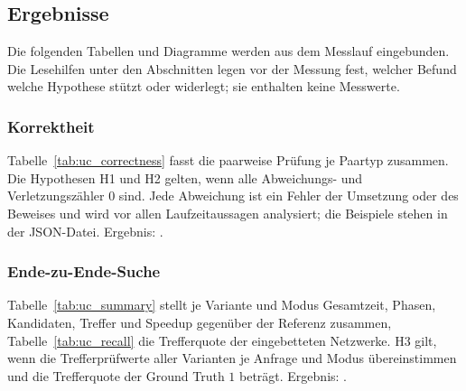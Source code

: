 \subsection{Ergebnisse}
\label{sec:ucx_ergebnisse}

Die folgenden Tabellen und Diagramme werden aus dem Messlauf eingebunden. Die Lesehilfen unter den Abschnitten legen vor der Messung fest, welcher Befund welche Hypothese stützt oder widerlegt; sie enthalten keine Messwerte.

\ucinputtables

\subsubsection{Korrektheit}

Tabelle~\ref{tab:uc_correctness} fasst die paarweise Prüfung je Paartyp zusammen. Die Hypothesen H1 und H2 gelten, wenn alle Abweichungs- und Verletzungszähler $0$ sind. Jede Abweichung ist ein Fehler der Umsetzung oder des Beweises und wird vor allen Laufzeitaussagen analysiert; die Beispiele stehen in der JSON-Datei. Ergebnis: .


\subsubsection{Ende-zu-Ende-Suche}

Tabelle~\ref{tab:uc_summary} stellt je Variante und Modus Gesamtzeit, Phasen, Kandidaten, Treffer und Speedup gegenüber der Referenz zusammen, Tabelle~\ref{tab:uc_recall} die Trefferquote der eingebetteten Netzwerke. H3 gilt, wenn die Trefferprüfwerte aller Varianten je Anfrage und Modus übereinstimmen und die Trefferquote der Ground Truth $1$ beträgt. Ergebnis: .


